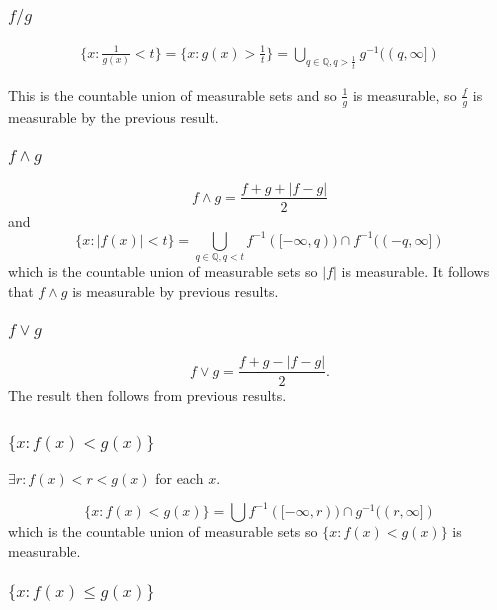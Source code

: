 \documentclass{unswmaths}
\begin{document}
\subsubsection{$ f/g $}

\begin{align*}
    \{ x : \frac{1}{g(x)} < t \} = \{ x : g(x) > \frac{1}{t} \}  = \bigcup_{q \in \mathbb{Q}, q > \frac{1}{t}} g^{-1}((q, \infty])
\end{align*}

This is the countable union of measurable sets and so $ \frac{1}{g} $ is measurable, so $ \frac{f}{g} $ is measurable by the previous result.

\subsubsection{$ f \wedge g $}

$$ f \wedge g = \frac{f + g + |f-g| }{2} $$
and
$$
    \{ x : |f(x)| < t \} = \bigcup_{q \in \mathbb{Q}, q < t} f^{-1}([-\infty, q)) \cap f^{-1}((-q, \infty]) 
$$
which is the countable union of measurable sets so $ |f| $ is measurable. It follows that $ f \wedge g $ is measurable by previous results.

\subsubsection{$ f \vee g $}

$$ f \vee g = \frac{f + g - |f-g| }{2}. $$ The result then follows from previous results.

\subsection{}

\subsubsection{$\{ x : f(x) < g(x) \}$}

$ \exists r : f(x) < r < g(x) $ for each $ x $.

$$
    \{ x : f(x) < g(x) \} = \bigcup f^{-1}([-\infty, r)) \cap g^{-1}((r, \infty])
$$
which is the countable union of measurable sets so $ \{ x : f(x) < g(x) \} $ is measurable.

\subsubsection{$\{ x : f(x) \leq g(x) \}$}
\end{document}
